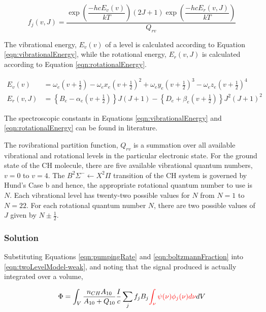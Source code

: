 \begin{equation}
  f_j(v,J) = \frac{ \exp{\left(\dfrac{-hcE_v(v)}{kT}\right)} (2J + 1)\exp{\left(\dfrac{-hcE_r(v, J)}{kT}\right)} }{ Q_{rv} }
  \label{eqn:boltzmannDistribution}
\end{equation}

The vibrational energy, \(E_v(v)\) of a level is calculated according to Equation \ref{eqn:vibrationalEnergy}, while the rotational energy, \(E_r(v,J)\) is calculated according to Equation \ref{eqn:rotationalEnergy}.

\begin{align}
  E_v(v) &= \omega_e \left(v+\frac{1}{2}\right) - \omega_ex_e \left(v+\frac{1}{2}\right)^2 + \omega_ey_e \left(v+\frac{1}{2}\right)^3 - \omega_ez_e \left(v+\frac{1}{2}\right)^4
  \label{eqn:vibrationalEnergy}\\
  E_r(v, J) &= \left\{B_e - \alpha_e \left(v+\frac{1}{2}\right)\right\}J(J+1) - \left\{D_e + \beta_e \left(v+\frac{1}{2}\right)\right\}J^2(J+1)^2
  \label{eqn:rotationalEnergy}
\end{align}

The spectroscopic constants in Equations \ref{eqn:vibrationalEnergy} and \ref{eqn:rotationalEnergy} can be found in literature\cite{1995-zachwieja}.

The rovibrational partition function, \(Q_{rv}\) is a summation over all available vibrational and rotational levels in the particular electronic state.
For the ground state of the CH molecule, there are five available vibrational quantum numbers, \(v = 0\) to \(v = 4\).
The \(B^2\Sigma^-\leftarrow X^2\Pi\) transition of the CH system is governed by Hund's Case b and hence, the appropriate rotational quantum number to use is \(N\).
Each vibrational level has twenty-two possible values for \(N\) from \(N = 1\) to \(N = 22\).
For each rotational quantum number \(N\), there are two possible values of \(J\) given by \(N \pm \frac{1}{2}\).

\subsubsection{Solution}
\label{subsubsec:basic-model-solution}

Substituting Equations \ref{eqn:pumpingRate} and \ref{eqn:boltzmannFraction} into \ref{eqn:twoLevelModel-weak}, and noting that the signal produced is actually integrated over a volume,

\begin{equation}
  \Phi = \int_V \frac{n_{CH} A_{10}}{A_{10} + Q_{10}} \frac{I}{c} \sum_j f_j B_j \textcolor{red}{\int_\nu \psi(\nu) \phi_j(\nu) d\nu} dV
  \label{eqn:twoLevelModel-unsimplified}
\end{equation}

